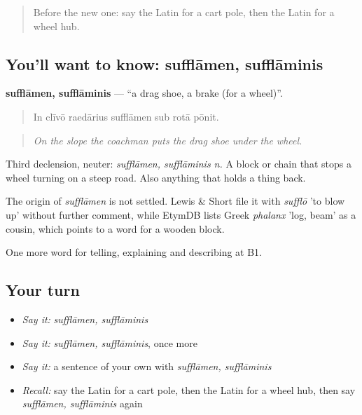\begin{quote}
Before the new one: say the Latin for a cart pole, then the Latin for a wheel hub.
\end{quote}

\subsection*{You'll want to know: sufflāmen, sufflāminis}
\textbf{sufflāmen, sufflāminis} — \textquotedblleft{}a drag shoe, a brake (for a wheel)\textquotedblright{}.

\begin{quote}
In clīvō raedārius sufflāmen sub rotā pōnit.
\end{quote}

\begin{quote}
\emph{On the slope the coachman puts the drag shoe under the wheel.}
\end{quote}

Third declension, neuter: \emph{sufflāmen, sufflāminis n.} A block or chain that stops a wheel turning on a steep road. Also anything that holds a thing back.

\begin{cousinweb}
The origin of \emph{sufflāmen} is not settled. Lewis \& Short file it with \emph{sufflō} 'to blow up' without further comment, while EtymDB lists Greek \emph{phalanx} 'log, beam' as a cousin, which points to a word for a wooden block.
\end{cousinweb}

\begin{grammarlens}[title={What you've built}]
One more word for telling, explaining and describing at B1.
\end{grammarlens}

\subsection*{Your turn}
\begin{itemize}
\raggedright
  \item \emph{Say it:} \emph{sufflāmen, sufflāminis}
  \item \emph{Say it:} \emph{sufflāmen, sufflāminis}, once more
  \item \emph{Say it:} a sentence of your own with \emph{sufflāmen, sufflāminis}
  \item \emph{Recall:} say the Latin for a cart pole, then the Latin for a wheel hub, then say \emph{sufflāmen, sufflāminis} again
\end{itemize}

